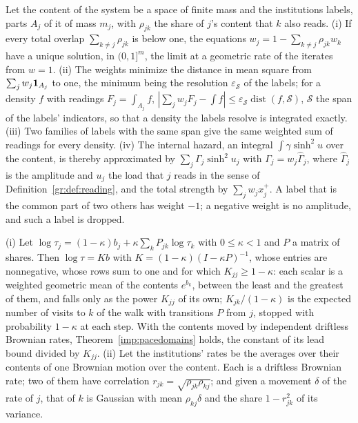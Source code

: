 \begin{proposition}\label{imp:weights}
Let the content of the system be a space of finite mass and the
institutions labels, parts $A_j$ of it of mass $m_j$, with $\rho_{jk}$ the
share of $j$'s content that $k$ also reads. (i) If every total overlap
$\sum_{k\neq j}\rho_{jk}$ is below one, the equations
$w_j=1-\sum_{k\neq j}\rho_{jk}w_k$ have a unique solution, in $(0,1]^m$,
the limit at a geometric rate of the iterates from $w=1$. (ii) The
weights minimize the distance in mean square from $\sum_jw_j\mathbf{1}_{A_j}$ to
one, the minimum being the resolution $\varepsilon_{\mathcal S}$ of the
labels; for a density $f$ with readings $F_j=\int_{A_j}f$,
$|\sum_jw_jF_j-\int f|\le\varepsilon_{\mathcal S}\operatorname{dist}(f,\mathcal S)$,
$\mathcal S$ the span of the labels' indicators, so that a density the
labels resolve is integrated exactly. (iii) Two families of labels with
the same span give the same weighted sum of readings for every density.
(iv) The internal hazard, an integral $\int\gamma\sinh^2u$ over the
content, is thereby approximated by $\sum_j\Gamma_j\sinh^2u_j$ with
$\Gamma_j=w_j\hat\Gamma_j$, where $\hat\Gamma_j$ is the amplitude and $u_j$
the load that $j$ reads in the sense of Definition~\ref{gr:def:reading},
and the total strength by $\sum_jw_jx_j^+$. A label that is the common
part of two others has weight $-1$; a negative weight is no amplitude,
and such a label is dropped.
\end{proposition}

\begin{proposition}\label{imp:listening}
(i) Let $\log\tau_j=(1-\kappa)b_j+\kappa\sum_kP_{jk}\log\tau_k$ with
$0\le\kappa<1$ and $P$ a matrix of shares. Then $\log\tau=Kb$ with
$K=(1-\kappa)(I-\kappa P)^{-1}$, whose entries are nonnegative, whose rows
sum to one and for which $K_{jj}\ge1-\kappa$: each scalar is a weighted
geometric mean of the contents $e^{b_k}$, between the least and the
greatest of them, and falls only as the power $K_{jj}$ of its own;
$K_{jk}/(1-\kappa)$ is the expected number of visits to $k$ of the walk
with transitions $P$ from $j$, stopped with probability $1-\kappa$ at each
step. With the contents moved by independent driftless Brownian rates,
Theorem~\ref{imp:pacedomains} holds, the constant of its lead bound
divided by $K_{jj}$. (ii) Let the institutions' rates be the averages over
their contents of one Brownian motion over the content. Each is a
driftless Brownian rate; two of them have correlation
$r_{jk}=\sqrt{\rho_{jk}\rho_{kj}}$; and given a movement $\delta$ of the
rate of $j$, that of $k$ is Gaussian with mean $\rho_{kj}\delta$ and the
share $1-r_{jk}^2$ of its variance.
\end{proposition}

